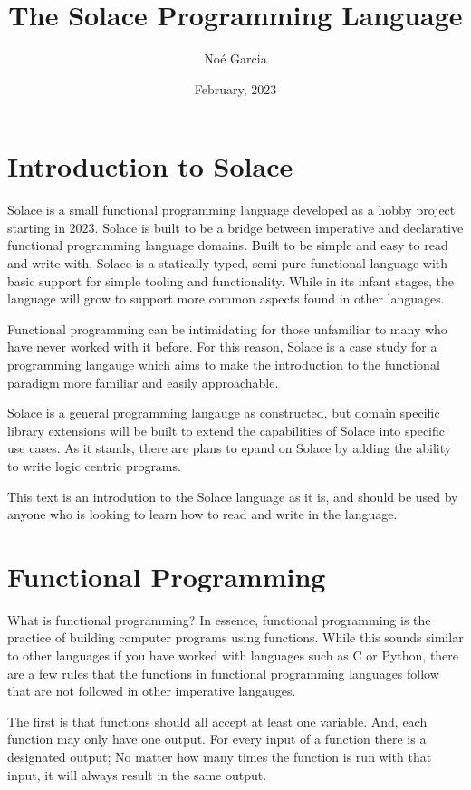 \documentclass{article}
\title{
	\vspace{2in}
	\textmd{\textbf{The Solace Programming Language}}
	\vspace{3in}
}
\author{No\'e Garcia}
\date{February, 2023}
\begin{document}
\maketitle
\newpage

\section{Introduction to Solace}
Solace is a small functional programming language developed as a hobby project starting in
$2023$. Solace is built to be a bridge between imperative and  declarative functional programming
language domains. Built to be simple and easy to read and write with, Solace is a statically typed,
semi-pure functional language with basic support for simple tooling and functionality. While in
its infant stages, the language will grow to support more common aspects found in other
languages.

Functional programming can be intimidating for those unfamiliar to many who have never worked
with it before. For this reason, Solace is a case study for a programming langauge which aims to
make the introduction to the functional paradigm more familiar and easily approachable.

Solace is a general programming langauge as constructed, but domain specific library extensions
will be built to extend the capabilities of Solace into specific use cases. As it stands, there are
plans to epand on Solace by adding the ability to write logic centric programs.

This text is an introdution to the Solace language as it is, and should be used by anyone who is looking
to learn how to read and write in the language.


\section{Functional Programming}
What is functional programming? In essence, functional programming is the practice of building computer
programs using functions. While this sounds similar to other languages if you have worked with languages
such as C or Python, there are a few rules that the functions in functional programming languages follow
that are not followed in other imperative langauges.

The first is that functions should all accept at least one variable. And, each function may only have one
output. For every input of a function there is a designated output; No matter how many times the function is
run with that input, it will always result in the same output.
\end{document}

